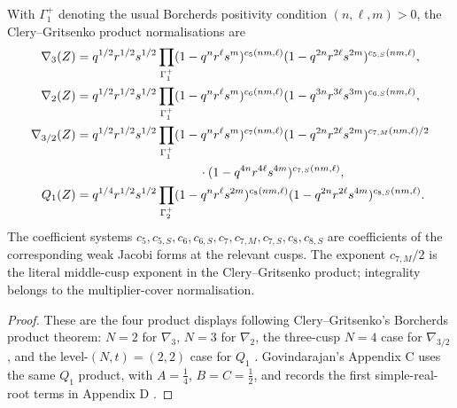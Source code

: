 \begin{theorem}
\label{thm:chl-boundary-product-normalisation-audit}
With \(\Gamma_1^{+}\) denoting the usual Borcherds positivity condition
\((n,\ell,m)>0\), the Clery--Gritsenko product normalisations are
\[
\begin{aligned}
\nabla_3(Z)
&=q^{1/2}r^{1/2}s^{1/2}
\prod_{\Gamma_1^+}
(1-q^nr^\ell s^m)^{c_5(nm,\ell)}
(1-q^{2n}r^{2\ell}s^{2m})^{c_{5,S}(nm,\ell)},\\
\nabla_2(Z)
&=q^{1/2}r^{1/2}s^{1/2}
\prod_{\Gamma_1^+}
(1-q^nr^\ell s^m)^{c_6(nm,\ell)}
(1-q^{3n}r^{3\ell}s^{3m})^{c_{6,S}(nm,\ell)},\\
\nabla_{3/2}(Z)
&=q^{1/2}r^{1/2}s^{1/2}
\prod_{\Gamma_1^+}
(1-q^nr^\ell s^m)^{c_7(nm,\ell)}
(1-q^{2n}r^{2\ell}s^{2m})^{c_{7,M}(nm,\ell)/2}\\
&\hspace{35mm}\cdot
(1-q^{4n}r^{4\ell}s^{4m})^{c_{7,S}(nm,\ell)},\\
Q_1(Z)
&=q^{1/4}r^{1/2}s^{1/2}
\prod_{\Gamma_2^+}
(1-q^nr^\ell s^{2m})^{c_8(nm,\ell)}
(1-q^{2n}r^{2\ell}s^{4m})^{c_{8,S}(nm,\ell)}.
\end{aligned}
\]
The coefficient systems \(c_5,c_{5,S},c_6,c_{6,S},c_7,c_{7,M},c_{7,S},c_8,c_{8,S}\)
are coefficients of the corresponding weak Jacobi forms at the relevant cusps.
The exponent \(c_{7,M}/2\) is the literal middle-cusp exponent in the
Clery--Gritsenko product; integrality belongs to the multiplier-cover
normalisation.
\end{theorem}

\begin{proof}
These are the four product displays following Clery--Gritsenko's
Borcherds product theorem: \(N=2\) for \(\nabla_3\), \(N=3\) for
\(\nabla_2\), the three-cusp \(N=4\) case for \(\nabla_{3/2}\), and the
level-\((N,t)=(2,2)\) case for \(Q_1\) \cite{GC}.  Govindarajan's Appendix C
uses the same \(Q_1\) product, with \(A=\frac14\), \(B=C=\frac12\), and records
the first simple-real-root terms in Appendix D \cite{Gov11BKM}.
\end{proof}

